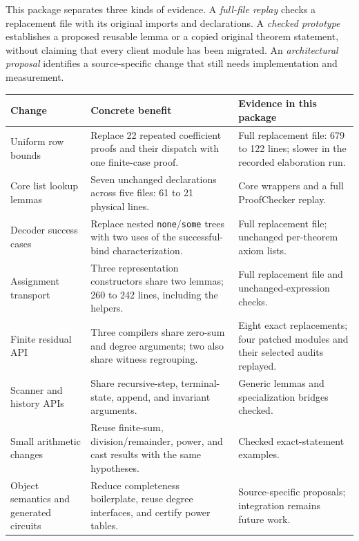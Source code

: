 \documentclass[11pt,letterpaper]{article}
\begin{document}
This package separates three kinds of evidence. A \emph{full-file replay}
checks a replacement file with its original imports and declarations. A
\emph{checked prototype} establishes a proposed reusable lemma or a copied
original theorem statement, without claiming that every client module has
been migrated. An \emph{architectural proposal} identifies a source-specific
change that still needs implementation and measurement.

\begin{longtable}{@{}>{\raggedright\arraybackslash}p{}>{\raggedright\arraybackslash}p{}>{\raggedright\arraybackslash}p{}@{}}
\toprule
Change & Concrete benefit & Evidence in this package\\
\midrule
\endhead
Uniform row bounds & Replace 22 repeated coefficient proofs and their dispatch
with one finite-case proof. & Full replacement file: 679 to 122 lines; slower in the recorded elaboration run.\\
Core list lookup lemmas & Seven unchanged declarations across five files:
61 to 21 physical lines. & Core wrappers and a full ProofChecker replay.\\
Decoder success cases & Replace nested \texttt{none}/\texttt{some} trees with
two uses of the successful-bind characterization. & Full replacement file; unchanged per-theorem axiom lists.\\
Assignment transport & Three representation constructors share two lemmas;
260 to 242 lines, including the helpers. & Full replacement file and
unchanged-expression checks.\\
Finite residual API & Three compilers share zero-sum and degree arguments;
two also share witness regrouping. & Eight exact replacements; four patched modules and their selected audits replayed.\\
Scanner and history APIs & Share recursive-step, terminal-state, append,
and invariant arguments. & Generic lemmas and specialization bridges checked.\\
Small arithmetic changes & Reuse finite-sum, division/remainder, power, and
cast results with the same hypotheses. & Checked exact-statement examples.\\
Object semantics and generated circuits & Reduce completeness boilerplate,
reuse degree interfaces, and certify power tables. & Source-specific proposals;
integration remains future work.\\
\bottomrule
\end{longtable}
\end{document}
